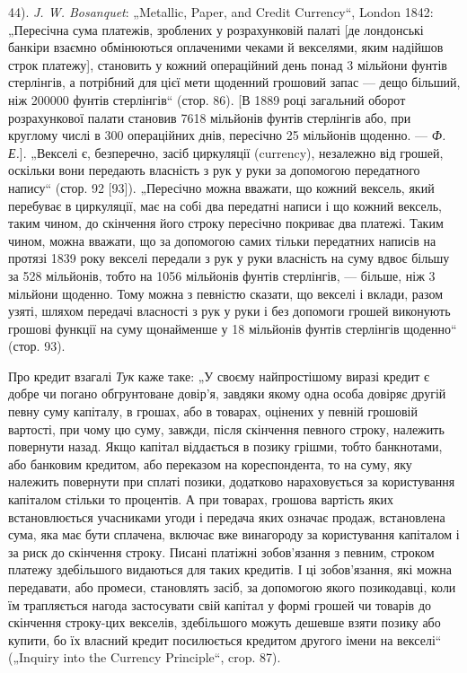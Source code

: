 \begin{small}
44). \emph{J. W. Bosanquet}: „Metallic, Paper, and Credit Currency“, London 1842: „Пересічна сума платежів,
зроблених у розрахунковій палаті [де лондонські банкіри взаємно обмінюються оплаченими чеками й
векселями, яким надійшов строк платежу], становить у кожний операційний день понад 3 мільйони фунтів
стерлінгів, а потрібний для цієї мети щоденний грошовий запас — дещо більший,
ніж 200000 фунтів стерлінгів“ (стор. 86). [В 1889 році загальний оборот розрахункової палати
становив 7618 мільйонів фунтів стерлінгів або, при круглому числі в 300 операційних днів,
пересічно 25 мільйонів щоденно. — \emph{Ф. Е.}]. „Векселі є, безперечно, засіб циркуляції (currency),
незалежно від грошей,
оскільки вони передають власність з рук у руки за допомогою передатного
напису“ (стор. 92 [93]). „Пересічно можна вважати, що кожний вексель,
який перебуває в циркуляції, має на собі два передатні написи і що кожний
вексель, таким чином, до скінчення його строку пересічно покриває два
платежі. Таким чином, можна вважати, що за допомогою самих тільки передатних
написів на протязі 1839 року векселі передали з рук у руки власність
на суму вдвоє більшу за 528 мільйонів, тобто на 1056 мільйонів фунтів стерлінгів,
— більше, ніж 3 мільйони щоденно. Тому можна з певністю сказати, що
векселі і вклади, разом узяті, шляхом передачі власності з рук у руки і без
допомоги грошей виконують грошові функції на суму щонайменше у 18 мільйонів
фунтів стерлінгів щоденно“ (стор. 93).

Про кредит взагалі \emph{Тук} каже таке: „У своєму найпростішому виразі кредит
є добре чи погано обгрунтоване довір’я, завдяки якому одна особа довіряє
другій певну суму капіталу, в грошах, або в товарах, оцінених у певній грошовій
вартості, при чому цю суму, завжди, після скінчення певного строку, належить
повернути назад. Якщо капітал віддається в позику грішми, тобто банкнотами,
або банковим кредитом, або переказом на кореспондента, то на суму, яку
належить повернути при сплаті позики, додатково нараховується за користування
капіталом стільки то процентів. А при товарах, грошова вартість яких встановлюється
учасниками угоди і передача яких означає продаж, встановлена сума,
яка має бути сплачена, включає вже винагороду за користування капіталом
і за риск до скінчення строку. Писані платіжні зобов’язання з певним, строком
платежу здебільшого видаються для таких кредитів. І ці зобов’язання, які
можна передавати, або промеси, становлять засіб, за допомогою якого позикодавці,
коли їм трапляється нагода застосувати свій капітал у формі грошей чи
товарів до скінчення строку-цих векселів, здебільшого можуть дешевше взяти
позику або купити, бо їх власний кредит посилюється кредитом другого імени
на векселі“ („Inquiry into the Currency Principle“, crop. 87).


\end{small}
